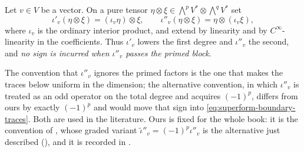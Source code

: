 \begin{definition}
\label{def:ch11-contractions}
Let $v\in V$ be a vector.  On a pure tensor
$\eta\otimes\xi\in\bigwedge^pV^*\otimes\bigwedge^qV^*$ set
\[
 \iota'_v(\eta\otimes\xi)=(\iota_v\eta)\otimes\xi,
 \qquad
 \iota''_v(\eta\otimes\xi)=\eta\otimes(\iota_v\xi),
\]
where $\iota_v$ is the ordinary interior product, and extend by linearity
and by $C^\infty$-linearity in the coefficients.  Thus $\iota'_v$ lowers the
first degree and $\iota''_v$ the second, and \emph{no sign is incurred when
$\iota''_v$ passes the primed block}.
\end{definition}

The convention that $\iota''_v$ ignores the primed factors is the one that
makes the traces below uniform in the dimension; the alternative convention,
in which $\iota''_v$ is treated as an odd operator on the total degree and
acquires $(-1)^p$, differs from ours by exactly $(-1)^p$ and would move that
sign into \eqref{eq:superform-boundary-traces}.  Both are used in the
literature.  Ours is fixed for the whole book: it is the convention of
, whose graded variant
$\widetilde\iota''_v=(-1)^p\iota''_v$ is the alternative just described
(), and it is recorded in
.

